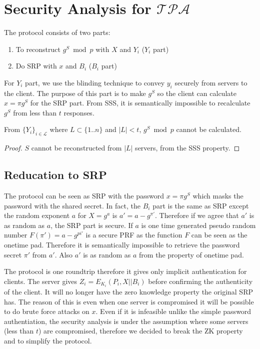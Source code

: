 \section{Security Analysis for $\mathcal{TPA}$}
The protocol consists of two parts:
\begin{enumerate}
\item To reconstruct $g^S \bmod p$ with $X$ and $Y_i$ ($Y_i$ part)
\item Do SRP with $x$ and $B_i$ ($B_i$ part)
\end{enumerate}

For $Y_i$ part, we use the blinding technique to convey $y_i$ securely
from servers to the client. The purpose of this part is to make $g^S$
so the client can calculate $x = \pi g^S$ for the SRP part. From SSS,
it is semantically impossible to recalculate $g^S$ from less than $t$
responses.

\begin{lemma}
\label{tpa1}
From $\{Y_i\}_{i \in \mathcal{L}}$ where $L \subset \{1..n\}$ and $|L| <
t$, $g^S \bmod p$ cannot be calculated.
\end{lemma}

\begin{proof}
$S$ cannot be reconstructed from $|L|$ servers, from the SSS
  property.
\end{proof}

\subsection{Reducation to SRP}
The protocol can be seen as SRP with the password $x = \pi g^S$ which
masks the password with the shared secret. In fact, the $B_i$ part is
the same as SRP except the random exponent $a$ for $X = g^a$ is $a' =
a - g^{\pi'}$. Therefore if we agree that $a'$ is as random as $a$,
the SRP part is secure. If $a$ is one time generated pseudo random
number $F(\pi') = a - g^{pi'}$ is a secure PRF as the function $F$ can
be seen as the onetime pad. Therefore it is semantically impossible to
retrieve the password secret $\pi'$ from $a'$. Also $a'$ is as random
as $a$ from the property of onetime pad.

The protocol is one roundtrip therefore it gives only implicit
authentication for clients. The server gives $Z_i = E_{K_i}(P_i,
X||B_i)$ before confirming the authenticity of the client. It will 
no longer have the zero knowledge property the original SRP has. The
reason of this is even when one server is compromised it will be
possible to do brute force attacks on $x$. Even if it is
infeasible unlike the simple password authentiation, the security
analysis is under the assumption where some servers (less than $t$)
are compromised, therefore we decided to break the ZK property and to
simplify the protocol.

